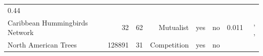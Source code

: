 \begin{longtable}[]{@{}lrrrrrrr@{}}
\begin{minipage}[t]{0.06\columnwidth}
0.44\strut
\end{minipage} & \begin{minipage}[t]{0.22\columnwidth}\raggedleft\strut
\citet{Baiser_2011}\strut
\end{minipage}\tabularnewline
\begin{minipage}[t]{0.15\columnwidth}\raggedright\strut
Caribbean Hummingbirds Network\strut
\end{minipage} & \begin{minipage}[t]{0.07\columnwidth}\raggedleft\strut
32\strut
\end{minipage} & \begin{minipage}[t]{0.07\columnwidth}\raggedleft\strut
62\strut
\end{minipage} & \begin{minipage}[t]{0.11\columnwidth}\raggedleft\strut
Mutualist\strut
\end{minipage} & \begin{minipage}[t]{0.05\columnwidth}\raggedleft\strut
yes\strut
\end{minipage} & \begin{minipage}[t]{0.04\columnwidth}\raggedleft\strut
no\strut
\end{minipage} & \begin{minipage}[t]{0.06\columnwidth}\raggedleft\strut
0.011\strut
\end{minipage} & \begin{minipage}[t]{0.22\columnwidth}\raggedleft\strut
\citet{Mart_n_Gonz_lez_2015}, \citet{Sonne_2016},
\citet{Lack_1973}\strut
\end{minipage}\tabularnewline
\begin{minipage}[t]{0.15\columnwidth}\raggedright\strut
North American Trees\strut
\end{minipage} & \begin{minipage}[t]{0.07\columnwidth}\raggedleft\strut
128891\strut
\end{minipage} & \begin{minipage}[t]{0.07\columnwidth}\raggedleft\strut
31\strut
\end{minipage} & \begin{minipage}[t]{0.11\columnwidth}\raggedleft\strut
Competition\strut
\end{minipage} & \begin{minipage}[t]{0.05\columnwidth}\raggedleft\strut
yes\strut
\end{minipage} & \begin{minipage}[t]{0.04\columnwidth}\raggedleft\strut
no\strut

\end{minipage}
\end{longtable}
